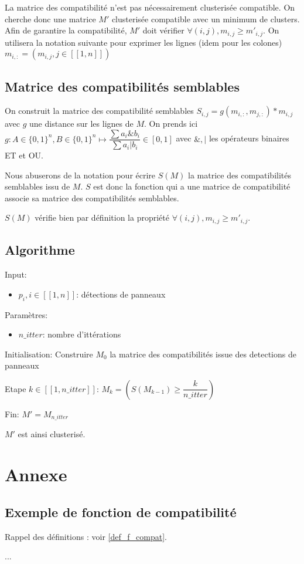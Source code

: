 \documentclass{article}
\begin{document}
La matrice des compatibilité n'est pas nécessairement clusterisée compatible. On cherche donc une matrice \(M'\) clusterisée compatible avec un minimum de clusters. Afin de garantire la compatibilité, \(M'\) doit vérifier \(\forall (i,j), m_{i,j} \geq m'_{i,j}\). On utilisera la notation suivante pour exprimer les lignes (idem pour les colones) \(m_{i, :} = (m_{i, j}, j\in[\![1, n]\!])\)

\subsection{Matrice des compatibilités semblables}

On construit la matrice des compatibilité semblables \(S_{i,j} = g(m_{i, :}, m_{j, :}) * m_{i,j}\) avec \(g\) une distance sur les lignes de \(M\). On prends ici \(g: A \in \{0,1\}^{n}, B \in \{0,1\}^{n} \mapsto \dfrac{\sum a_{i}\&b_{i}}{\sum a_{i}|b_{i}} \in [0, 1]\) avec \(\&, |\) les opérateurs binaires ET et OU.

Nous abuserons de la notation pour écrire \(S(M)\) la matrice des compatibilités semblables issu de \(M\). \(S\) est donc la fonction qui a une matrice de compatibilité associe sa matrice des compatibilités semblables.

\(S(M)\) vérifie bien par définition la propriété \(\forall (i,j), m_{i,j} \geq m'_{i,j}\).

\subsection{Algorithme}

Input:
\begin{itemize}
\item	\(p_{i}, i \in [\![1, n]\!]\): détections de panneaux
\end{itemize}
Paramètres:
\begin{itemize}
\item	\(n\_itter\): nombre d'ittérations
\end{itemize}

Initialisation:
Construire \(M_{0}\) la matrice des compatibilités issue des detections de panneaux

Etape \(k \in [\![1, n\_itter]\!]\):
\(M_{k} = \left(S(M_{k-1}) \geq \dfrac{k}{n\_itter}\right)\)

Fin:
\(M' = M_{n\_itter}\)

\(M'\) est ainsi clusterisé. 


\section{Annexe}

\subsection{Exemple de fonction de compatibilité}

\label{ex_f_compat}
Rappel des définitions : voir \ref{def_f_compat}.

...
\end{document}
